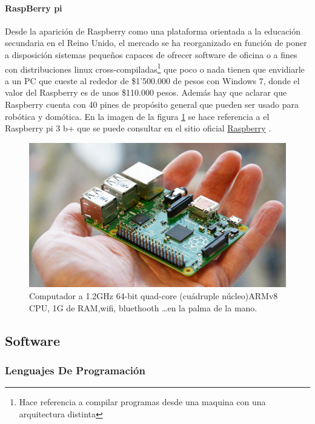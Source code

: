 \documentclass{article}
\begin{document}
\paragraph{RaspBerry pi}

Desde la aparición de Raspberry como una plataforma orientada a la educación
secundaria en el Reino Unido, el mercado se ha reorganizado en función
de poner a disposición sistemas pequeños capaces de ofrecer software de 
oficina o a fines con distribuciones linux 
cross-compiladas\footnote{Hace referencia a compilar programas desde una 
		maquina con una arquitectura distinta } que
poco o nada tienen que envidiarle a un PC que cueste al rededor de
\$1'500.000 de pesos con Windows 7, donde el valor del Raspberry es de unos
\$110.000 pesos.  Además hay que aclarar que Raspberry cuenta con 40 pines
de propósito general que pueden ser usado para robótica y domótica. En la 
imagen de la figura \ref{fig:raspberry} se hace referencia a el Raspberry pi 3 b+ que se puede
consultar en el sitio oficial \href{https://www.raspberrypi.org/}{Raspberry}
.


\begin{figure}[hptp]
    \centering
    \includegraphics[scale=0.4]{imag/raspberryPi2.jpg}
    \caption{Computador a 1.2GHz 64-bit quad-core (cuádruple núcleo)ARMv8 
			CPU, 1G de RAM,wifi, bluethooth \dots en la palma de la mano.}
    \label{fig:raspberry}
\end{figure}
\smallskip

\subsection{Software}

\subsubsection{Lenguajes De Programación}
\end{document}

